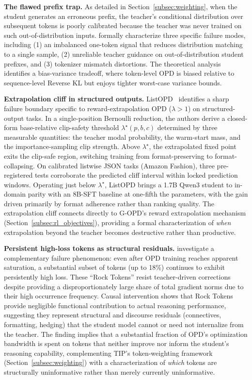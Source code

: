 \documentclass{article} %
\begin{document}
\textbf{The flawed prefix trap.} As detailed in Section~\ref{subsec:weighting}, when the student generates an erroneous prefix, the teacher's conditional distribution over subsequent tokens is poorly calibrated because the teacher was never trained on such out-of-distribution inputs. \citet{2603.25562} formally characterize three specific failure modes, including (1) an imbalanced one-token signal that reduces distribution matching to a single sample, (2) unreliable teacher guidance on out-of-distribution student prefixes, and (3) tokenizer mismatch distortions. The theoretical analysis identifies a bias-variance tradeoff, where token-level OPD is biased relative to sequence-level Reverse KL but enjoys tighter worst-case variance bounds.

\textbf{Extrapolation cliff in structured outputs.} ListOPD~\citep{2605.08737} identifies a sharp failure boundary specific to reward-extrapolation OPD ($\lambda > 1$) on structured-output tasks. In a single-position Bernoulli reduction, the authors derive a closed-form base-relative clip-safety threshold $\lambda^\star(p, b, c)$ determined by three measurable quantities: the teacher modal probability, the warm-start mass, and the importance-sampling clip strength. Above $\lambda^\star$, the extrapolated fixed point exits the clip-safe region, switching training from format-preserving to format-collapsing. On calibrated listwise JSON tasks (Amazon Fashion), three pre-registered tests corroborate the predicted cliff interval within locked prediction windows. Operating just below $\lambda^\star$, ListOPD brings a 1.7B Qwen3 student to in-domain parity with an 8B-SFT baseline at one-fifth the parameters, with the gain driven primarily by format adherence rather than ranking quality. The extrapolation cliff connects directly to G-OPD's reward extrapolation mechanism (Section~\ref{subsec:rl_objectives}), providing a formal characterization of \emph{when} extrapolation beyond the teacher becomes destructive rather than productive.

\textbf{Persistent high-loss tokens as structural residuals.} \citet{2605.09253} investigate a complementary failure phenomenon: even after OPD training reaches apparent saturation, a substantial subset of tokens (up to 18\%) continues to exhibit persistently high loss. These ``Rock Tokens'' resist teacher-driven corrections despite providing a disproportionately large share of total gradient norms due to their high occurrence frequency. Causal intervention shows that Rock Tokens provide negligible functional contribution to actual reasoning performance, suggesting they represent structural and discourse residuals (connectives, formatting, hedging) that the student model cannot or need not internalize from the teacher. The finding implies that a substantial fraction of OPD's optimization bandwidth is spent on tokens that neither improve nor inform the student's reasoning capability, complementing TIP's token-weighting framework (Section~\ref{subsec:weighting}) with a characterization of \emph{which} tokens are structurally uninformative rather than merely currently uninformative.
\end{document}

